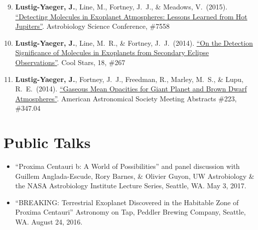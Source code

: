 \documentclass[margin,10pt]{res}
\newenvironment{benumerate}[1]{
    \let\oldItem\item
    \def\item{\addtocounter{enumi}{-2}\oldItem}
    \begin{enumerate}
    \setcounter{enumi}{#1}
    \addtocounter{enumi}{1}
}{
    \end{enumerate}
}
\begin{document}
\begin{resume}
\begin{benumerate}{8}
                    \item \textbf{Lustig-Yaeger, J.}, Line, M., Fortney, J.~J., \& Meadows, V.\ (2015). \href{http://www.hou.usra.edu/meetings/abscicon2015/pdf/7558.pdf}{``Detecting Molecules in Exoplanet Atmospheres: Lessons Learned from Hot Jupiters''}. Astrobiology Science Conference, \#7558
                    \item \textbf{Lustig-Yaeger, J.},  Line, M.~R., \& Fortney, J.~J.\ (2014). \href{http://www2.lowell.edu/workshops/coolstars18/abstracts-posters/poster-abstract-267.html}{``On the Detection Significance of Molecules in Exoplanets from Secondary Eclipse Observations''}. Cool Stars, 18, \#267
                    \item \textbf{Lustig-Yaeger, J.}, Fortney, J.~J., Freedman, R., Marley, M.~S., \& Lupu, R.~E.\ (2014). \href{http://adsabs.harvard.edu/abs/2014AAS...22334704L}{``Gaseous Mean Opacities for Giant Planet and Brown Dwarf Atmospheres''}. American Astronomical Society Meeting Abstracts \#223, \#347.04\\
                 \end{benumerate}
                 
 \section{Public Talks}
                \begin{itemize}  
                    \item ``Proxima Centauri b: A World of Possibilities'' and panel discussion with Guillem Anglada-Escude, Rory Barnes, \& Olivier Guyon, UW Astrobiology \& the NASA Astrobiology Institute Lecture Series, Seattle, WA. May 3, 2017.
                    \item ``BREAKING: Terrestrial Exoplanet Discovered in the Habitable Zone of Proxima Centauri'' Astronomy on Tap, Peddler Brewing Company, Seattle, WA. August 24, 2016.
                 \end{itemize}

\end{resume}
\end{document}
